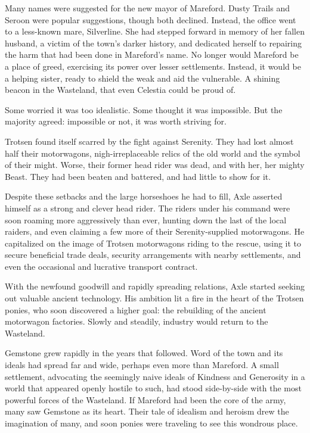 Many names were suggested for the new mayor of Mareford. Dusty Trails and Seroon were popular suggestions, though both declined. Instead, the office went to a less-known mare, Silverline. She had stepped forward in memory of her fallen husband, a victim of the town’s darker history, and dedicated herself to repairing the harm that had been done in Mareford’s name. No longer would Mareford be a place of greed, exercising its power over lesser settlements. Instead, it would be a helping sister, ready to shield the weak and aid the vulnerable. A shining beacon in the Wasteland, that even Celestia could be proud of.

Some worried it was too idealistic. Some thought it was impossible. But the majority agreed: impossible or not, it was worth striving for.

{\br}%
Trotsen found itself scarred by the fight against Serenity. They had lost almost half their motorwagons, nigh-irreplaceable relics of the old world and the symbol of their might. Worse, their former head rider was dead, and with her, her mighty Beast. They had been beaten and battered, and had little to show for it.

Despite these setbacks and the large horseshoes he had to fill, Axle asserted himself as a strong and clever head rider. The riders under his command were soon roaming more aggressively than ever, hunting down the last of the local raiders, and even claiming a few more of their Serenity-supplied motorwagons. He capitalized on the image of Trotsen motorwagons riding to the rescue, using it to secure beneficial trade deals, security arrangements with nearby settlements, and even the occasional and lucrative transport contract.

With the newfound goodwill and rapidly spreading relations, Axle started seeking out valuable ancient technology. His ambition lit a fire in the heart of the Trotsen ponies, who soon discovered a higher goal: the rebuilding of the ancient motorwagon factories. Slowly and steadily, industry would return to the Wasteland.

{\br}%
Gemstone grew rapidly in the years that followed. Word of the town and its ideals had spread far and wide, perhaps even more than Mareford. A small settlement, advocating the seemingly naive ideals of Kindness and Generosity in a world that appeared openly hostile to such, had stood side-by-side with the most powerful forces of the Wasteland. If Mareford had been the core of the army, many saw Gemstone as its heart. Their tale of idealism and heroism drew the imagination of many, and soon ponies were traveling to see this wondrous place.

